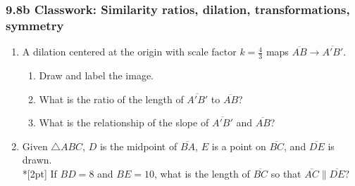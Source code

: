 \documentclass[12pt, twoside]{article}
\begin{document}
\subsubsection*{9.8b Classwork: Similarity ratios, dilation, transformations, symmetry}
  \begin{enumerate}

\item A dilation centered at the origin with scale factor $k=\frac{4}{3}$ maps $\overline{AB} \rightarrow \overline{A'B'}$. 
  \begin{multicols}{2}
    \begin{enumerate}
      \item Draw and label the image.
      \item What is the ratio of the length of $\overline{A'B'}$ to $\overline{AB}$?
      \item What is the relationship of the slope of $\overline{A'B'}$ and $\overline{AB}$?
      \begin{flushright}
      \end{flushright}
    \end{enumerate}
    \end{multicols} \vspace{1cm}
    
  \item Given $\triangle ABC$, $D$ is the midpoint of $\overline{BA}$, $E$ is a point on $\overline{BC}$, and $\overline{DE}$ is drawn. \\*[2pt] 
    If $BD=8$ and $BE=10$, what is the length of $\overline{BC}$ so that $\overline{AC} \parallel \overline{DE}$?
    \begin{flushright}
      \end{flushright}


\end{enumerate}
\end{document}
